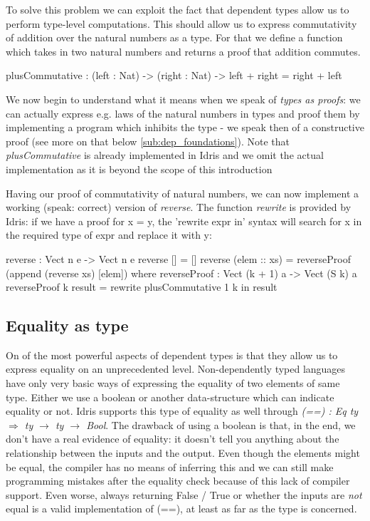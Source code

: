 To solve this problem we can exploit the fact that dependent types allow us to perform type-level computations. This should allow us to express commutativity of addition over the natural numbers as a type. For that we define a function which takes in two natural numbers and returns a proof that addition commutes. 

\begin{HaskellCode}
plusCommutative : (left : Nat) -> (right : Nat) -> left + right = right + left
\end{HaskellCode}

We now begin to understand what it means when we speak of \textit{types as proofs}: we can actually express e.g. laws of the natural numbers in types and proof them by implementing a program which inhibits the type - we speak then of a constructive proof (see more on that below \ref{sub:dep_foundations}). Note that \textit{plusCommutative} is already implemented in Idris and we omit the actual implementation as it is beyond the scope of this introduction

Having our proof of commutativity of natural numbers, we can now implement a working (speak: correct) version of \textit{reverse}. The function \textit{rewrite} is provided by Idris: if we have a proof for x = y, the 'rewrite expr in' syntax will search for x in the required type of expr and replace it with y:

\begin{HaskellCode}
reverse : Vect n e -> Vect n e
reverse [] = []
reverse (elem :: xs) = reverseProof (append (reverse xs) [elem])
  where
    reverseProof : Vect (k + 1) a -> Vect (S k) a
    reverseProof {k} result = rewrite plusCommutative 1 k in result
\end{HaskellCode}

\subsection{Equality as type}
\label{sub:dep_equality}
On of the most powerful aspects of dependent types is that they allow us to express equality on an unprecedented level. Non-dependently typed languages have only very basic ways of expressing the equality of two elements of same type. Either we use a boolean or another data-structure which can indicate equality or not. Idris supports this type of equality as well through \textit{(==) : Eq ty $\Rightarrow$ ty $\rightarrow$ ty $\rightarrow$ Bool}. The drawback of using a boolean is that, in the end, we don't have a real evidence of equality: it doesn't tell you anything about the relationship between the inputs and the output. Even though the elements might be equal, the compiler has no means of inferring this and we can still make programming mistakes after the equality check because of this lack of compiler support. Even worse, always returning False / True or whether the inputs are \textit{not} equal is a valid implementation of (==), at least as far as the type is concerned.

